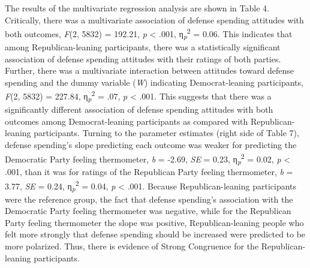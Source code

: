 \documentclass[authordate, meta, issue]{jote-new-article}
\begin{document}
	The results of the multivariate regression analysis are shown in Table 4. Critically, there was a multivariate association of defense spending attitudes with both outcomes, \emph{F}(2, 5832) = 192.21, \emph{p }< .001, η\textsubscript{\emph{p}}\textsuperscript{2} = 0.06. This indicates that among Republican-leaning participants, there was a statistically significant association of defense spending attitudes with their ratings of both parties. Further, there was a multivariate interaction between attitudes toward defense spending and the dummy variable (\emph{W}) indicating Democrat-leaning participants, \emph{F}(2, 5832) = 227.84, η\textsubscript{\emph{p}}\textsuperscript{2} = .07, \emph{p }< .001. This suggests that there was a significantly different association of defense spending attitudes with both outcomes among Democrat-leaning participants as compared with Republican-leaning participants. Turning to the parameter estimates (right side of Table 7), defense spending's slope predicting each outcome was weaker for predicting the Democratic Party feeling thermometer, \emph{b }= -2.69, \emph{SE }= 0.23, η\textsubscript{\emph{p}}\textsuperscript{2} = 0.02, \emph{p }< .001, than it was for ratings of the Republican Party feeling thermometer, \emph{b }= 3.77, \emph{SE }= 0.24, η\textsubscript{\emph{p}}\textsuperscript{2} = 0.04, \emph{p }< .001. Because Republican-leaning participants were the reference group, the fact that defense spending's association with the Democratic Party feeling thermometer was negative, while for the Republican Party feeling thermometer the slope was positive, Republican-leaning people who felt more strongly that defense spending should be increased were predicted to be more polarized. Thus, there is evidence of Strong Congruence for the Republican-leaning participants.
\end{document}
